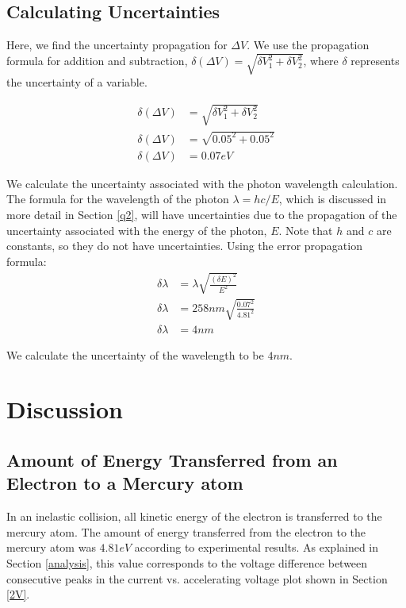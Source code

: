 \documentclass[12pt,twocolumn,letterpaper]{article}
\begin{document}
\subsection{Calculating Uncertainties} \label{uncertainties}
Here, we find the uncertainty propagation for $\Delta V$. We use the propagation formula for addition and subtraction, $\delta (\Delta V) = \sqrt{\delta V_1^2 + \delta V_2^2}$, where $\delta$ represents the uncertainty of a variable.

\begin{align*}
    \delta (\Delta V) &= \sqrt{\delta V_1^2 + \delta V_2^2}\\
    \delta (\Delta V) &= \sqrt{0.05^2 + 0.05^2}\\
    \delta (\Delta V) &= 0.07 eV
\end{align*}

We calculate the uncertainty associated with the photon wavelength calculation. The formula for the wavelength of the photon $\lambda = hc/E$, which is discussed in more detail in Section \ref{q2}, will have uncertainties due to the propagation of the uncertainty associated with the energy of the photon, $E$. Note that $h$ and $c$ are constants, so they do not have uncertainties. Using the error propagation formula:
\begin{align*}
    \delta \lambda &= \lambda \sqrt{\frac{(\delta E)^2}{E^2}}\\
    \delta \lambda &= 258nm \sqrt{\frac{0.07^2}{4.81^2}}\\
    \delta \lambda &= 4nm
\end{align*}

We calculate the uncertainty of the wavelength to be $4nm$.
\section{Discussion}
\subsection{Amount of Energy Transferred from an Electron to a Mercury atom}

In an inelastic collision, all kinetic energy of the electron is transferred to the mercury atom. The amount of energy transferred from the electron to the mercury atom was $4.81 eV$ according to experimental results. As explained in Section \ref{analysis}, this value corresponds to the voltage difference between consecutive peaks in the current vs. accelerating voltage plot shown in Section \ref{2V}.
\end{document}
